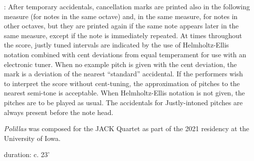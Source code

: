 \documentclass[11pt]{article}
\begin{document}
\begin{center}
 : After temporary accidentals, cancellation marks are printed also in the following measure (for notes in the same octave) and, in the same measure, for notes in other octaves, but they are printed again if the same note appears later in the same measure, except if the note is immediately repeated. At times throughout the score, justly tuned intervals are indicated by the use of Helmholtz-Ellis notation combined with cent deviations from equal temperament for use with an electronic tuner. When no example pitch is given with the cent deviation, the mark is a deviation of the nearest ``standard'' accidental. If the performers wish to interpret the score without cent-tuning, the approximation of pitches to the nearest semi-tone is acceptable. When Helmholtz-Ellis notation is not given, the pitches are to be played as usual. The accidentals for Justly-intoned pitches are always present before the note head.
\rightskip\leftskip
\phantom{text} \hfill \phantom{()}
\end{center}
\endgroup

\vspace*{1\baselineskip}

\begin{center}
\textit{Polillas} was composed for the JACK Quartet as part of the 2021 residency at the University of Iowa.
\end{center}

\vspace*{1\baselineskip}

\begin{center}
duration: c. 23'
\end{center}
\end{document}
